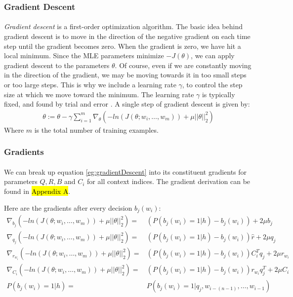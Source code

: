 \subsubsection{Gradient Descent}
\paragraph{}
\emph{Gradient descent} is a first-order optimization algorithm. The basic idea behind gradient descent is to move in the direction of the negative gradient on each time step until the gradient becomes zero. When the gradient is zero, we have hit a local minimum. Since the MLE parameters minimize $-J(\theta)$, we can apply gradient descent to the parameters $\theta$. Of course, even if we are constantly moving in the direction of the gradient, we may be moving towards it in too small steps or too large steps. This is why we include a learning rate $\gamma$, to control the step size at which we move toward the minimum. The learning rate $\gamma$ is typically fixed, and found by trial and error \cite{Elkan2013}.
A single step of gradient descent is given by:
\begin{align}
\theta := \theta - \gamma \sum_{i=1}^{m} \nabla_\theta \left( -ln(J(\theta;w_i,\dots, w_m)) +  \mu ||\theta||^2_2 \right) \label{eg:gradientDescent} 
\end{align}
Where $m$ is the total number of training examples.

\subsubsection{Gradients}
\paragraph{}
We can break up equation \ref{eg:gradientDescent} into its constituent gradients for parameters $Q,R,B$ and $C_i$ for all context indices. The gradient derivation can be found in \hl{Appendix A}.

Here are the gradients after every decision $b_j(w_i)$:
\begin{align}
\nabla_{b_j} \left( -ln(J(\theta;w_i,\dots, w_m)) +  \mu ||\theta||^2_2 \right)  = &  \left( P \left(b_j(w_i) = 1 | h \right) - b_j(w_i) \right) +2\mu b_j  \label{eq:gradients}
\\
\nabla_{q_j} \left( -ln(J(\theta;w_i,\dots, w_m)) +  \mu ||\theta||^2_2 \right)  = &\left( P \left(b_j(w_i) = 1 | h \right) - b_j(w_i) \right)\hat{r} +2\mu q_j \nonumber
\\
\nabla_{r_{w_i}} \left( -ln(J(\theta;w_i,\dots, w_m)) +  \mu ||\theta||^2_2 \right)  = & \left( P \left(b_j(w_i) = 1 | h \right) - b_j(w_i)\right) C_i^T q_j   +2\mu r_{w_i} \nonumber
\\
\nabla_{C_i} \left( -ln(J(\theta;w_i,\dots, w_m)) +  \mu ||\theta||^2_2 \right)  = &\left( P \left(b_j(w_i) = 1 | h \right) - b_j(w_i) \right) r_{w_i}q_j^T  +2\mu C_i \nonumber
\\
P \left(b_j(w_i) = 1 | h \right)= & P \left(b_j(w_i) = 1 | q_j, w_{i-(n-1)},\dots, w_{i-1} \right) \nonumber
\end{align}

